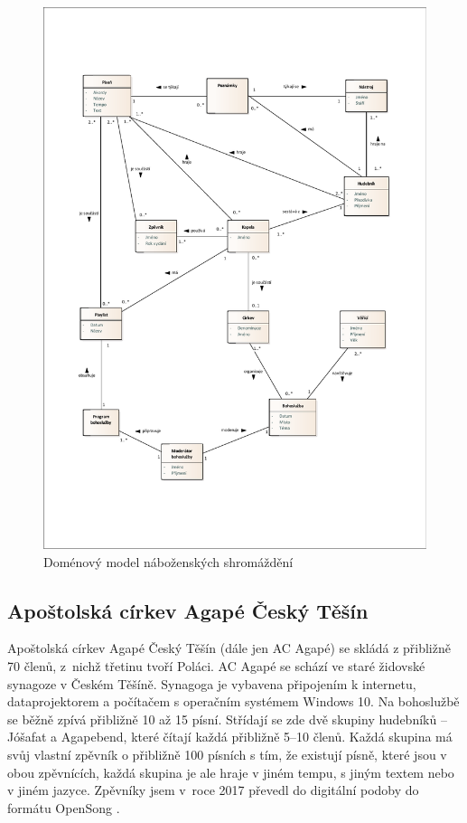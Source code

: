 \begin{figure}
    \includegraphics[width=\textwidth]{images/2-analyza/2-2-domenovy-model.pdf}
    \caption{Doménový model náboženských shromáždění}
\end{figure}

\subsection{Apoštolská církev Agapé Český Těšín}
\label{ac-agape}

Apoštolská církev Agapé Český Těšín (dále jen AC Agapé) \cite{ac-agape} se skládá z přibližně 70 členů, z~nichž třetinu tvoří Poláci. AC Agapé se schází ve staré židovské synagoze v Českém Těšíně. Synagoga je vybavena připojením k internetu, dataprojektorem a počítačem s operačním systémem Windows 10. Na bohoslužbě se běžně zpívá přibližně 10 až 15 písní. Střídají se zde dvě skupiny hudebníků -- Jóšafat a Agapebend, které čítají každá přibližně 5--10 členů. Každá skupina má svůj vlastní zpěvník o přibližně 100 písních s tím, že existují písně, které jsou v obou zpěvnících, každá skupina je ale hraje v jiném tempu, s jiným textem nebo v jiném jazyce. Zpěvníky jsem v~roce 2017 převedl do digitální podoby do formátu OpenSong \cite{open-song-format}.

